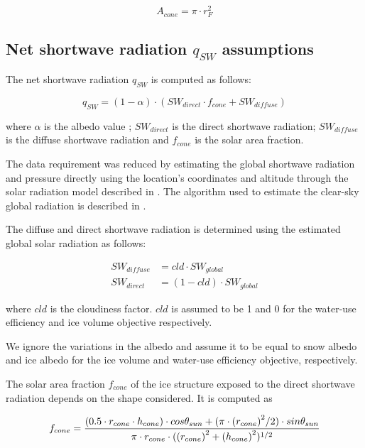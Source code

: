 \documentclass[tc, manuscript]{copernicus}
\begin{document}
\begin{equation} A_{cone} =\pi \cdot r_{F}^2  \end{equation}

\subsection{Net shortwave radiation \texorpdfstring{$q_{SW}$}{Lg} assumptions}
\label{sec:SW}

The net shortwave radiation $q_{SW}$ is computed as follows:

\begin{equation} 
q_{SW} = (1- \alpha) \cdot ( SW_{direct} \cdot f_{cone} + SW_{diffuse})
\label{eqn:SW} 
\end{equation}

where $\alpha$ is the albedo value ; $SW_{direct}$ is the direct shortwave radiation; $SW_{diffuse}$ is the
diffuse shortwave radiation and $f_{cone}$ is the solar area fraction.

The data requirement was reduced by estimating the global shortwave radiation and pressure directly using the
location's coordinates and altitude through the solar radiation model described in
\citet{holmgrenPvlibPythonPython2018}. The algorithm used to estimate the clear-sky global radiation is
described in \citet{ineichenBroadbandSimplifiedVersion2008}.  

The diffuse and direct shortwave radiation is determined using the estimated global solar radiation as follows:

\begin{equation}
\begin{split}
  SW_{diffuse} &= cld \cdot SW_{global}\\
  SW_{direct} &= (1-cld) \cdot SW_{global}
\end{split}
\end{equation}

where $cld$ is the cloudiness factor. $cld$ is assumed to be 1 and 0 for the water-use efficiency and ice volume
objective respectively.

We ignore the variations in the albedo and assume it to be equal to snow albedo and ice albedo for the  ice
volume and water-use efficiency objective, respectively.

The solar area fraction $f_{cone}$ of the ice structure exposed to the direct shortwave radiation depends on the
shape considered. It is computed as

\begin{equation}
		f_{cone} =\frac{(0.5 \cdot r_{cone} \cdot h_{cone}) \cdot cos \theta_{sun} +(\pi \cdot
			{(r_{cone})}^2/2) \cdot sin \theta_{sun} }{\pi \cdot r_{cone} \cdot ({(r_{cone})}^2+{(h_{cone})}^2)^{1/2}}\\
\end{equation}
\end{document}

